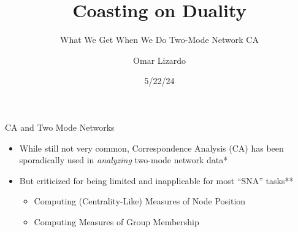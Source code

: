 \documentclass[
  ignorenonframetext,
]{beamer}
\title{Coasting on Duality}
\subtitle{What We Get When We Do Two-Mode Network CA}
\author{Omar Lizardo}
\date{5/22/24}
\institute{\emph{University of California, Los Angeles}}
\providecommand{\tightlist}{%
  \setlength{\itemsep}{0pt}\setlength{\parskip}{0pt}}\usepackage{longtable,booktabs,array}
\begin{document}
\frame{\titlepage}
\ifdefined\Shaded\renewenvironment{Shaded}{\begin{tcolorbox}[enhanced, frame hidden, sharp corners, borderline west={3pt}{0pt}{shadecolor}, boxrule=0pt, breakable, interior hidden]}{\end{tcolorbox}}\fi

\begin{frame}{CA and Two Mode Networks}
\protect\hypertarget{ca-and-two-mode-networks}{}
\begin{itemize}
\tightlist
\item
  While still not very common, Correspondence Analysis (CA) has been
  sporadically used in \emph{analyzing} two-mode network data*
\item
  But criticized for being limited and inapplicable for most ``SNA''
  tasks**

  \begin{itemize}
  \tightlist
  \item
    Computing (Centrality-Like) Measures of Node Position
  \item
    Computing Measures of Group Membership
  \end{itemize}
\end{itemize}

\end{frame}
\end{document}
